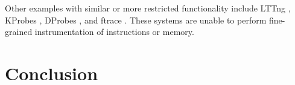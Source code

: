 \documentclass[preprint]{sigplanconf}
\begin{document}
Other examples with similar or more restricted functionality include LTTng \cite{LTTng}, KProbes \cite{KProbes}, DProbes \cite{DProbes}, and ftrace \cite{ftrace}. These systems are unable to perform fine-grained instrumentation of instructions or memory.


\section{Conclusion}\label{sec:conclusion}






\end{document}
